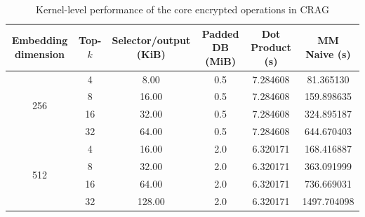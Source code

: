\begin{table}[hbt!]
\centering
\caption{Kernel-level performance of the core encrypted operations in CRAG}
\label{tab:performance-results}
\vspace{3pt}
\begin{tabular}{cccccc}
\hline
\textbf{Embedding dimension} & \textbf{Top-$k$} &
\textbf{Selector/output (KiB)} & \textbf{Padded DB (MiB)} &
\textbf{Dot Product (s)} & \textbf{MM Naive (s)} \\
\hline
\multirow{4}{*}{256}
& 4  & 8.00  & 0.5 & 7.284608 & 81.365130 \\
& 8  & 16.00 & 0.5 & 7.284608 & 159.898635 \\
& 16 & 32.00 & 0.5 & 7.284608 & 324.895187 \\
& 32 & 64.00 & 0.5 & 7.284608 & 644.670403 \\
\hline
\multirow{4}{*}{512}
& 4  & 16.00  & 2.0 & 6.320171 & 168.416887 \\
& 8  & 32.00  & 2.0 & 6.320171 & 363.091999 \\
& 16 & 64.00  & 2.0 & 6.320171 & 736.669031 \\
& 32 & 128.00 & 2.0 & 6.320171 & 1497.704098 \\
\hline
\end{tabular}
\end{table}
